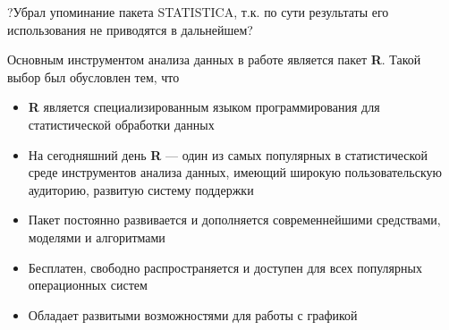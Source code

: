 ?Убрал упоминание пакета STATISTICA, т.к. по сути результаты его использования не приводятся в дальнейшем?

Основным инструментом анализа данных в работе является пакет \textbf{R}. Такой выбор был обусловлен тем, что
\begin{itemize}
  \item \textbf{R} является специализированным языком программирования для статистической обработки данных
  \item На сегодняшний день \textbf{R} --- один из самых популярных в статистической среде инструментов анализа данных, имеющий широкую пользовательскую аудиторию, развитую систему поддержки
  \item Пакет постоянно развивается и дополняется современнейшими средствами, моделями и алгоритмами
  \item Бесплатен, свободно распространяется и доступен для всех популярных операционных систем
  \item Обладает развитыми возможностями для работы с графикой
\end{itemize}
